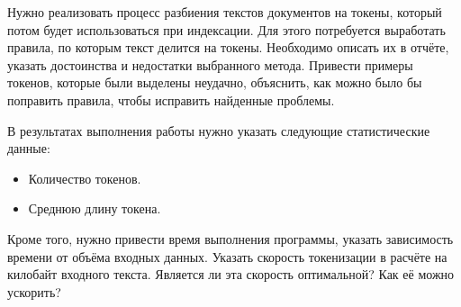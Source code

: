 
Нужно реализовать процесс разбиения текстов документов на токены, который потом будет использоваться при индексации. Для этого потребуется выработать правила, по которым текст делится на токены. Необходимо описать их в отчёте, указать достоинства и недостатки выбранного метода. Привести примеры токенов, которые были выделены неудачно, объяснить, как можно было бы поправить правила, чтобы исправить найденные проблемы.

В результатах выполнения работы нужно указать следующие статистические данные:

\begin{itemize}
    \item Количество токенов.
    \item Среднюю длину токена.
\end{itemize}

Кроме того, нужно привести время выполнения программы, указать зависимость времени от объёма входных данных. Указать скорость токенизации в расчёте на килобайт входного текста. Является ли эта скорость оптимальной? Как её можно ускорить?


\pagebreak
